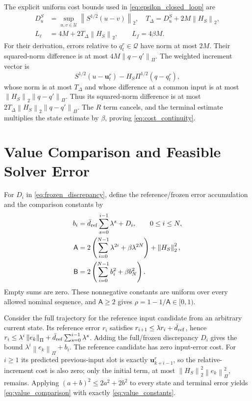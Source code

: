 \documentclass[journal]{IEEEtran}
\newcommand{\vu}{\mathbf{u}}
\newcommand{\norm}[1]{\left\lVert #1\right\rVert}
\begin{document}
The explicit uniform cost bounds used in \eqref{eq:epsilon_closed_loop} are
\begin{equation}
\begin{split}
D_u^S&=\sup_{u,v\in\mathcal U}\norm{S^{1/2}(u-v)}_2,\quad
T_\Delta=D_u^S+2M\norm{H_S}_2,\\
L_\ell&=4M+2T_\Delta\norm{H_S}_2,\qquad L_f=4\beta M.
\end{split}
\label{eq:cost_continuity}
\end{equation}
For their derivation, errors relative to $q_t^r\in\mathcal Q$ have norm at most $2M$. Their squared-norm difference is at most $4M\norm{q-q'}_\Pi$. The weighted increment vector is
\begin{equation*}
S^{1/2}(u-\vu_t^r)-H_S\Pi^{1/2}(q-q_t^r),
\end{equation*}
whose norm is at most $T_\Delta$ and whose difference at a common input is at most $\norm{H_S}_2\norm{q-q'}_\Pi$. Thus its squared-norm difference is at most $2T_\Delta\norm{H_S}_2\norm{q-q'}_\Pi$. The $R$ term cancels, and the terminal estimate multiplies the state estimate by $\beta$, proving \eqref{eq:cost_continuity}.

\section{Value Comparison and Feasible Solver Error}
\label{app:comparison}
For $D_i$ in \eqref{eq:frozen_discrepancy}, define the reference/frozen error accumulation and the comparison constants by
\begin{equation}
\begin{split}
b_i&=\bar d_{\rm ref}\sum_{s=0}^{i-1}\lambda^s+D_i,\qquad 0\le i\le N,\\
\mathsf A&=2\left(\sum_{i=0}^{N-1}\lambda^{2i}+\beta\lambda^{2N}\right)
+\norm{H_S}_2^2,\\
\mathsf B&=2\left(\sum_{i=0}^{N-1}b_i^2+\beta b_N^2\right).
\end{split}
\label{eq:value_constants}
\end{equation}
Empty sums are zero. These nonnegative constants are uniform over every allowed nominal sequence, and $\mathsf A\ge2$ gives $\rho=1-1/\mathsf A\in[0,1)$.

Consider the full trajectory for the reference input candidate from an arbitrary current state. Its reference error $r_i$ satisfies $r_{i+1}\le\lambda r_i+\bar d_{\rm ref}$, hence $r_i\le\lambda^i\norm{e_k}_\Pi+\bar d_{\rm ref}\sum_{s=0}^{i-1}\lambda^s$. Adding the full/frozen discrepancy $D_i$ gives the bound $\lambda^i\norm{e_k}_\Pi+b_i$. The reference candidate has zero input-error cost. For $i\ge1$ its predicted previous-input slot is exactly $\vu_{k+i-1}^r$, so the relative-increment cost is also zero; only the initial term, at most $\norm{H_S}_2^2\norm{e_k}_\Pi^2$, remains. Applying $(a+b)^2\le2a^2+2b^2$ to every state and terminal error yields \eqref{eq:value_comparison} with exactly \eqref{eq:value_constants}.
\end{document}
